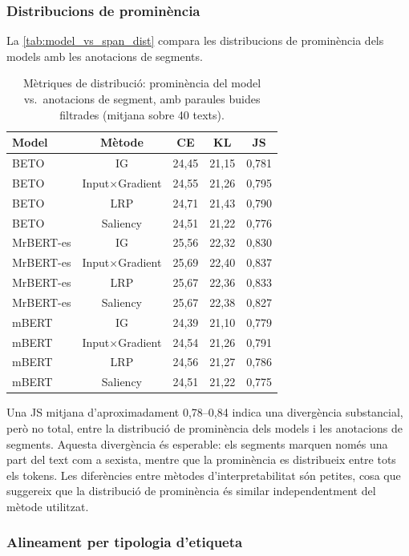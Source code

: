 \subsubsection{Distribucions de prominència}

La \autoref{tab:model_vs_span_dist} compara les distribucions de prominència dels models amb les anotacions de segments.

\iftables
\begin{table}[htbp]
\small
\centering
\begin{tabular}{lcccc}
\toprule
\textbf{Model} & \textbf{Mètode} & \textbf{CE} & \textbf{KL} & \textbf{JS} \\
\midrule
BETO & IG & 24,45 & 21,15 & 0,781 \\
BETO & Input$\times$Gradient & 24,55 & 21,26 & 0,795 \\
BETO & LRP & 24,71 & 21,43 & 0,790 \\
BETO & Saliency & 24,51 & 21,22 & 0,776 \\
MrBERT-es & IG & 25,56 & 22,32 & 0,830 \\
MrBERT-es & Input$\times$Gradient & 25,69 & 22,40 & 0,837 \\
MrBERT-es & LRP & 25,67 & 22,36 & 0,833 \\
MrBERT-es & Saliency & 25,67 & 22,38 & 0,827 \\
mBERT & IG & 24,39 & 21,10 & 0,779 \\
mBERT & Input$\times$Gradient & 24,54 & 21,26 & 0,791 \\
mBERT & LRP & 24,56 & 21,27 & 0,786 \\
mBERT & Saliency & 24,51 & 21,22 & 0,775 \\
\bottomrule
\end{tabular}
\caption{Mètriques de distribució: prominència del model vs.\ anotacions de segment, amb paraules buides filtrades (mitjana sobre 40 texts).}
\label{tab:model_vs_span_dist}
\end{table}
\fi

Una JS mitjana d'aproximadament 0,78--0,84 indica una divergència substancial, però no total, entre la distribució de prominència dels models i les anotacions de segments.
Aquesta divergència és esperable: els segments marquen només una part del text com a sexista, mentre que la prominència es distribueix entre tots els tokens.
Les diferències entre mètodes d'interpretabilitat són petites, cosa que suggereix que la distribució de prominència és similar independentment del mètode utilitzat.

\subsubsection{Alineament per tipologia d'etiqueta}

